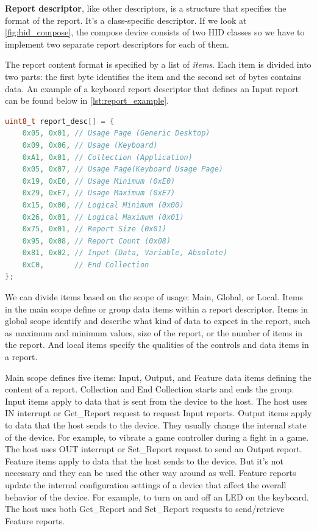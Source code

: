 \textbf{Report descriptor}, like other descriptors, is a structure that specifies the format of the report. It's a class-specific descriptor. If we look at \autoref{fig:hid_compose}, the compose device consists of two HID classes so we have to implement two separate report descriptors for each of them.

The report content format is specified by a list of \emph{items}. Each item is divided into two parts: the first byte identifies the item and the second set of bytes contains data. An example of a keyboard report descriptor that defines an Input report can be found below in \autoref{lst:report_example}.
\begin{lstlisting}[caption={Example of report descriptor in C language},
                   label={lst:report_example},
                   language=c]
uint8_t report_desc[] = {
    0x05, 0x01, // Usage Page (Generic Desktop)
    0x09, 0x06, // Usage (Keyboard)
    0xA1, 0x01, // Collection (Application)
    0x05, 0x07, // Usage Page(Keyboard Usage Page)
    0x19, 0xE0, // Usage Minimum (0xE0)
    0x29, 0xE7, // Usage Maximum (0xE7)
    0x15, 0x00, // Logical Minimum (0x00)
    0x26, 0x01, // Logical Maximum (0x01)
    0x75, 0x01, // Report Size (0x01)
    0x95, 0x08, // Report Count (0x08)
    0x81, 0x02, // Input (Data, Variable, Absolute)
    0xC0,       // End Collection
};
\end{lstlisting}

We can divide items based on the scope of usage: Main, Global, or Local. Items in the main scope define or group data items within a report descriptor. Items in global scope identify and describe what kind of data to expect in the report, such as maximum and minimum values, size of the report, or the number of items in the report. And local items specify the qualities of the controls and data items in a report.

Main scope defines five items: Input, Output, and Feature data items defining the content of a report. Collection and End Collection starts and ends the group. Input items apply to data that is sent from the device to the host. The host uses IN interrupt or Get\_Report request to request Input reports. Output items apply to data that the host sends to the device. They usually change the internal state of the device. For example, to vibrate a game controller during a fight in a game. The host uses OUT interrupt or Set\_Report request to send an Output report. Feature items apply to data that the host sends to the device. But it's not necessary and they can be used the other way around as well. Feature reports update the internal configuration settings of a device that affect the overall behavior of the device. For example, to turn on and off an LED on the keyboard. The host uses both Get\_Report and Set\_Report requests to send/retrieve Feature reports.

